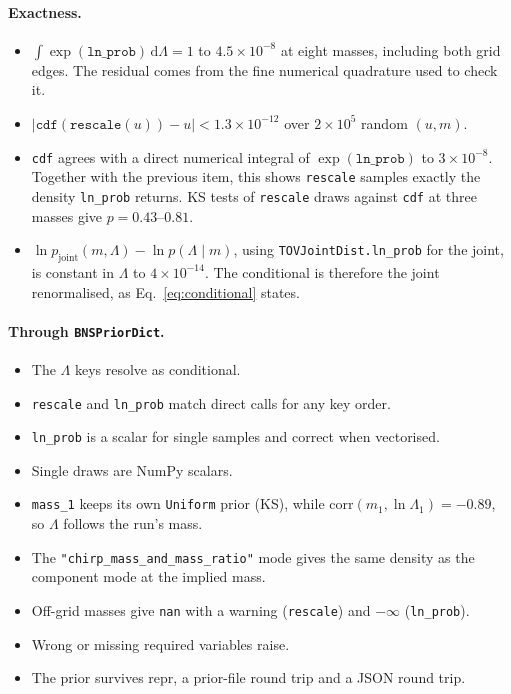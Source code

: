 \documentclass[11pt,a4paper]{article}
\newcommand{\dd}{\mathrm{d}}
\newcommand{\code}[1]{\texttt{#1}}
\begin{document}
\paragraph{Exactness.}
\begin{itemize}
  \item $\int \exp(\code{ln\_prob})\,\dd\Lambda = 1$ to $4.5\times10^{-8}$ at eight
    masses, including both grid edges. The residual comes from the fine
    numerical quadrature used to check it.
  \item $\lvert \code{cdf}(\code{rescale}(u)) - u \rvert < 1.3\times10^{-12}$
    over $2\times10^5$ random $(u, m)$.
  \item \code{cdf} agrees with a direct numerical integral of
    $\exp(\code{ln\_prob})$ to $3\times10^{-8}$. Together with the previous
    item, this shows \code{rescale} samples exactly the density \code{ln\_prob}
    returns. KS tests of \code{rescale} draws against \code{cdf} at three masses
    give $p = 0.43$--$0.81$.
  \item $\ln p_{\mathrm{joint}}(m, \Lambda) - \ln p(\Lambda \mid m)$, using
    \code{TOVJointDist.ln\_prob} for the joint, is constant in $\Lambda$ to
    $4\times10^{-14}$. The conditional is therefore the joint renormalised, as
    Eq.~\eqref{eq:conditional} states.
\end{itemize}

\paragraph{Through \code{BNSPriorDict}.}
\begin{itemize}
  \item The $\Lambda$ keys resolve as conditional.
  \item \code{rescale} and \code{ln\_prob} match direct calls for any key order.
  \item \code{ln\_prob} is a scalar for single samples and correct when
    vectorised.
  \item Single draws are NumPy scalars.
  \item \code{mass\_1} keeps its own \code{Uniform} prior (KS), while
    $\mathrm{corr}(m_1, \ln\Lambda_1) = -0.89$, so $\Lambda$ follows the run's
    mass.
  \item The \code{"chirp\_mass\_and\_mass\_ratio"} mode gives the same density
    as the component mode at the implied mass.
  \item Off-grid masses give \code{nan} with a warning (\code{rescale}) and
    $-\infty$ (\code{ln\_prob}).
  \item Wrong or missing required variables raise.
  \item The prior survives repr, a prior-file round trip and a JSON round trip.
\end{itemize}
\end{document}

